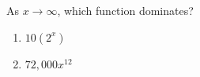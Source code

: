 \bigskip

\item As $x \rightarrow \infty$, which function dominates?

\begin{enumerate}
\item $10(2^x)$
\item $72,000 x^{12}$
\end{enumerate}

